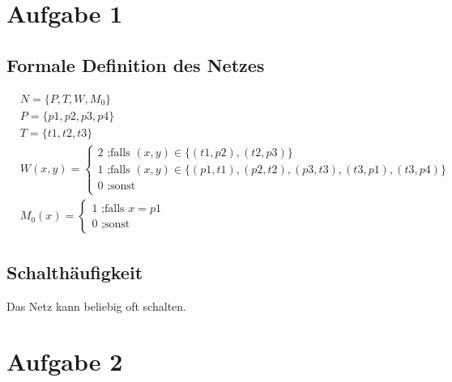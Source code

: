 \documentclass[10pt]{scrartcl}
\author{André Harms, Oliver Steenbuck}
\title{\titletext}
\date{19.04.2012}
\begin{document}
\maketitle

\setcounter{tocdepth}{3}
\tableofcontents

	\listoffigures  
	\lstlistoflistings	

\section{Aufgabe 1}
	\subsection{Formale Definition des Netzes}
	\begin{align}
	&N =\{P,T,W,M_0\}\\
	&P =\{p1,p2,p3,p4\}\\
	&T =\{t1,t2,t3\}\\
	&W(x,y) =\begin{cases}
			2 \text{ ;falls } (x,y) \in \{(t1,p2),(t2,p3)\} \\
			1 \text{ ;falls } (x,y) \in \{(p1,t1),(p2,t2), (p3,t3), (t3,p1), (t3,p4)\} \\
			0 \text{ ;sonst}
	     \end{cases}\\
	&M_0(x)=  \begin{cases}
			1 \text{ ;falls } x=p1\\
			0 \text{ ;sonst}
	     \end{cases}   
	\end{align}	

	\subsection{Schalthäufigkeit}
	Das Netz kann beliebig oft schalten.

\section{Aufgabe 2}
\end{document}
